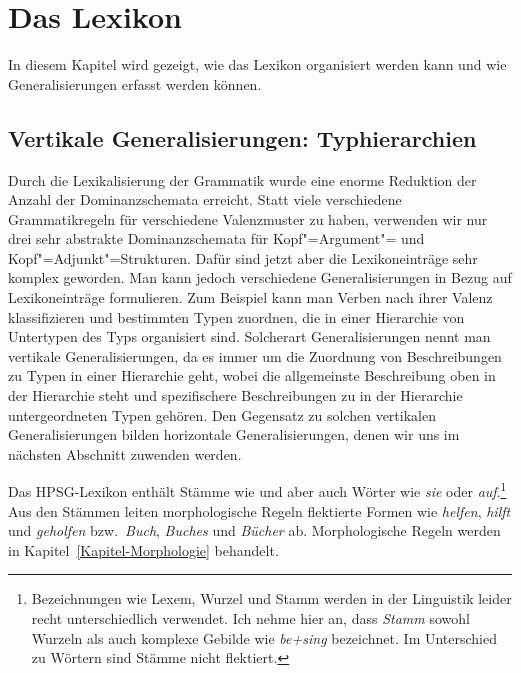 

\chapter{Das Lexikon}
\label{Kapitel-Lexikon}

In diesem Kapitel wird gezeigt, wie das Lexikon organisiert werden kann
und wie Generalisierungen erfasst werden können.


\section{Vertikale Generalisierungen: Typhierarchien}
\label{Abschnitt-Typhierarchien}

Durch die Lexikalisierung der Grammatik wurde eine enorme Reduktion der Anzahl der Dominanzschemata
erreicht. Statt viele verschiedene Grammatikregeln für verschiedene Valenzmuster zu haben, verwenden
wir nur drei sehr abstrakte Dominanzschemata für Kopf"=Argument"= und Kopf"=Adjunkt"=Strukturen. Dafür sind jetzt aber
die Lexikoneinträge sehr komplex geworden. Man kann jedoch verschiedene Generalisierungen in Bezug auf
Lexikoneinträge formulieren. Zum Beispiel kann man Verben nach ihrer Valenz klassifizieren
und bestimmten Typen zuordnen, die in einer Hierarchie von Untertypen des Typs 
organisiert sind. Solcherart Generalisierungen nennt man vertikale Generalisierungen, da
es immer um die Zuordnung von Beschreibungen zu Typen in einer Hierarchie geht, wobei die
allgemeinste Beschreibung oben in der Hierarchie steht und spezifischere Beschreibungen
zu in der Hierarchie untergeordneten Typen gehören. Den Gegensatz zu solchen vertikalen
Generalisierungen bilden horizontale Generalisierungen, denen wir uns im nächsten Abschnitt zuwenden werden.

Das HPSG-Lexikon enthält Stämme wie \zb {} und  aber auch Wörter wie \emph{sie}
oder \emph{auf}.\footnote{
  Bezeichnungen wie Lexem, Wurzel und Stamm 
  werden in der Linguistik leider recht unterschiedlich verwendet. 
  Ich nehme hier an, dass \emph{Stamm} sowohl Wurzeln als auch komplexe Gebilde wie
  \emph{be+sing} bezeichnet. Im Unterschied zu Wörtern sind Stämme nicht flektiert.%
} Aus den Stämmen leiten morphologische Regeln flektierte Formen wie \emph{helfen},
\emph{hilft} und \emph{geholfen} bzw.\ \emph{Buch}, \emph{Buches} und \emph{Bücher}
ab. Morphologische Regeln werden in Kapitel~\ref{Kapitel-Morphologie} behandelt.

